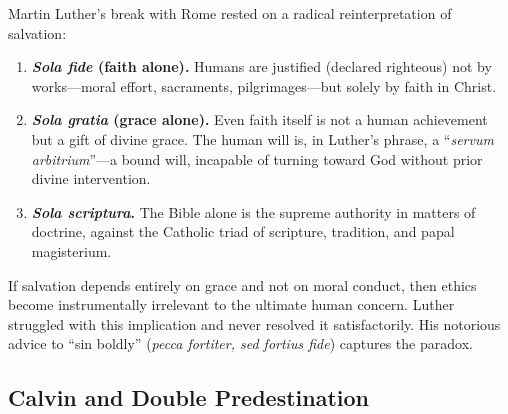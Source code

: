 \documentclass[11pt,twoside]{article}
\begin{document}
\begin{scheda}

Martin Luther's break with Rome rested on a radical
reinterpretation of salvation:

\begin{enumerate}
  \item \textbf{\textit{Sola fide} (faith alone).}
    Humans are justified (declared righteous) not by works---moral effort,
    sacraments, pilgrimages---but solely by faith in Christ.
  \item \textbf{\textit{Sola gratia} (grace alone).}
    Even faith itself is not a human achievement but a gift of divine
    grace.  The human will is, in Luther's phrase, a
    ``\textit{servum arbitrium}''---a bound will,
    incapable of turning toward God without prior divine intervention.
  \item \textbf{\textit{Sola scriptura}.}
    The Bible alone is the supreme authority in matters of doctrine, against
    the Catholic triad of scripture, tradition, and papal magisterium.
\end{enumerate}

\begin{notabox}
If salvation depends entirely on grace and not on moral conduct, then ethics
become instrumentally irrelevant to the ultimate human concern.  Luther
struggled with this implication and never resolved it satisfactorily.
His notorious advice to ``sin boldly'' (\textit{pecca
fortiter, sed fortius fide}) captures the paradox.
\end{notabox}
\end{scheda}

\subsection{Calvin and Double Predestination}
\end{document}
